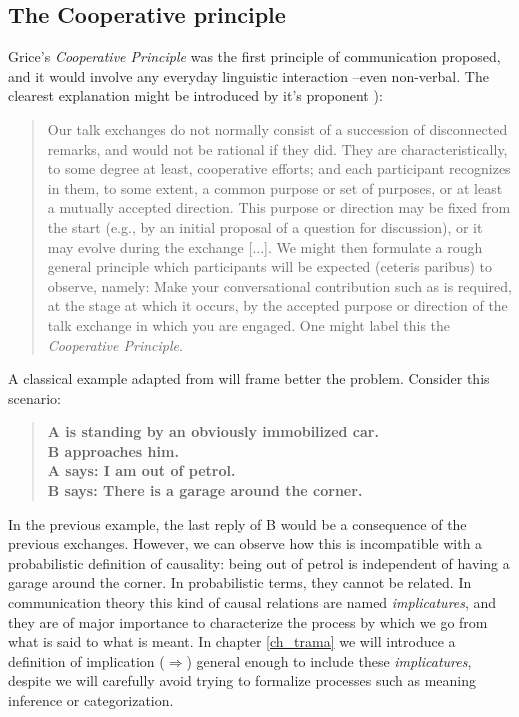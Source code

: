 \documentclass[
		twoside,openright,titlepage,numbers=noenddot,manychapters,
		headinclude,%
                footinclude=false,cleardoublepage=empty,
                BCOR=5mm,
		fontsize=11pt, %
                 enabledeprecatedfontcommands]{scrreprt}
\begin{document}
\subsection{The Cooperative principle}
Grice's \emph{Cooperative Principle} was the first principle of communication proposed, and it would involve any everyday linguistic interaction --even non-verbal. The clearest explanation might be introduced by it's proponent \cite[]{grice200lac}):
\begin{quote}
    Our talk exchanges do not normally consist of a succession of disconnected remarks, and would not be
rational if they did. They are characteristically, to some degree at least, cooperative efforts;
and each participant recognizes in them, to some extent, a common purpose or set of
purposes, or at least a mutually accepted direction. This purpose or direction may be fixed
from the start (e.g., by an initial proposal of a question for discussion), or it may evolve
during the exchange [...]. We might then formulate a rough general principle which participants will be expected (ceteris paribus) to observe, namely: Make your conversational contribution such as is required, at the stage at which it occurs, by the accepted purpose or direction of the talk exchange in which you are
engaged. One might label this the \emph{Cooperative Principle}.
\end{quote}
A classical example adapted from \cite{grice200lac} will frame better the problem. Consider this scenario:
\begin{quote}\begin{small}\bf
A is standing by an obviously immobilized car. \\
 B approaches him. \\
 A says: I am out of petrol. \\
B says: There is a garage around the corner. \\
\end{small}
\end{quote}
In the previous example, the last reply of B would be a consequence of the previous exchanges. However, we can observe how this is incompatible with a probabilistic definition of causality: being out of petrol is independent of having a garage around the corner. In probabilistic terms, they cannot be related.  In communication theory this kind of causal relations are named \emph{implicatures}, and they are of major importance to characterize the process by which we go from what is said to what is meant.
In chapter \ref{ch_trama} we will introduce a definition of implication ($\Rightarrow$) general enough to include these \emph{implicatures}, despite we will carefully avoid trying to formalize  processes such as meaning inference or categorization.
\end{document}
